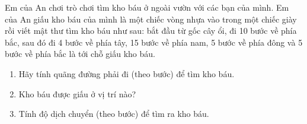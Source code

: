 \begin{ex}
	Em của An chơi trò chơi tìm kho báu ở ngoài vườn với các bạn của mình. Em của An giấu kho báu của mình là một chiếc vòng nhựa vào trong một chiếc giày rồi viết mật thư tìm kho báu như sau: bắt đầu từ gốc cây ổi, đi 10 bước về phía bắc, sau đó đi 4 bước về phía tây, 15 bước về phía nam, 5 bước về phía đông và 5 bước về phía bắc là tới chỗ giấu kho báu.
	\begin{enumerate}[label=\alph*)]
		\item Hãy tính quãng đường phải đi (theo bước) để tìm kho báu.
		\item Kho báu được giấu ở vị trí nào?
		\item Tính độ dịch chuyển (theo bước) để tìm ra kho báu.
	\end{enumerate}
	
\end{ex}


